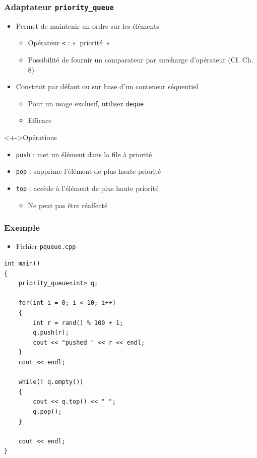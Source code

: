 \begin{frame}
\frametitle{Adaptateur \lstinline|priority_queue|}
\begin{itemize}[<+->]
\item Permet de maintenir un ordre sur les éléments
	\begin{itemize}
	\item Opérateur \texttt{<} : «~priorité~»
	\item Possibilité de fournir un comparateur par surcharge d'opérateur (Cf. Ch. 8)
	\end{itemize}
\item Construit par défaut ou sur base d'un conteneur séquentiel
	\begin{itemize}
	\item Pour un usage exclusif, utilisez \texttt{deque}
	\item Efficace
	\end{itemize}
\end{itemize}
\begin{exampleblock}<+->{Opérations}
	\begin{itemize}[<+->]
	\item \lstinline|push| : met un élément dans la file à priorité
	\item \lstinline|pop| : supprime l'élément de plus haute priorité
	\item \lstinline|top| : accède à l'élément de plus haute priorité
		\begin{itemize}
		\item Ne peut pas être réaffecté
		\end{itemize}
	\end{itemize}
\end{exampleblock}
\end{frame}

\begin{frame}[containsverbatim]
\frametitle{Exemple}
\begin{itemize}
\item Fichier \texttt{pqueue.cpp}
\end{itemize}
\begin{lstlisting}
int main()
{	
	priority_queue<int> q;
	
	for(int i = 0; i < 10; i++)
	{
		int r = rand() % 100 + 1;
		q.push(r);
		cout << "pushed " << r << endl;
	}	
	cout << endl;

	while(! q.empty())
	{
		cout << q.top() << " ";
		q.pop();
	}

	cout << endl;
}
\end{lstlisting}
\end{frame}


